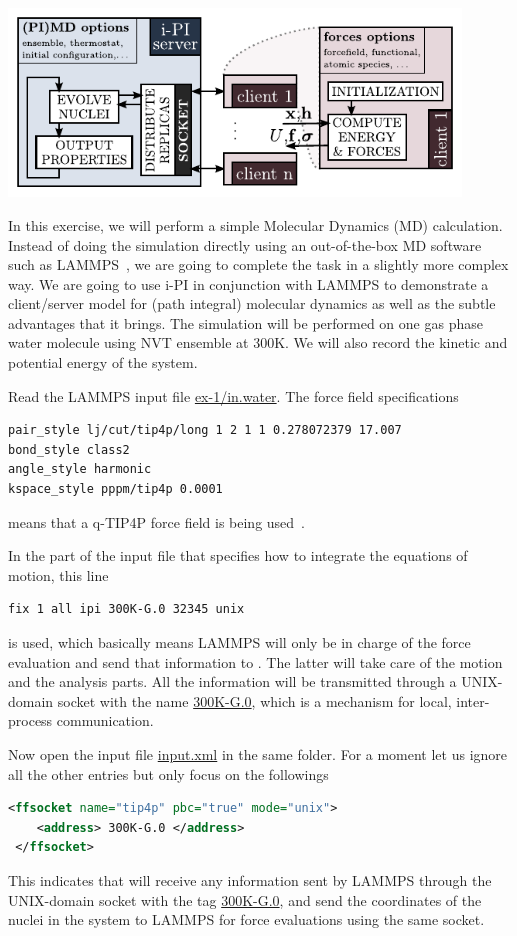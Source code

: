 \documentclass{article}
\begin{document}
\begin{Exercise}[label={i-pi},title={Molecular Dynamics: a client/server approach}]
{\centering\includegraphics[width=0.9\textwidth]{ipi-scheme.pdf}}

In this exercise, we will perform a simple Molecular Dynamics (MD) calculation.
Instead of doing the simulation directly using an out-of-the-box MD software such as LAMMPS~\cite{plim95jcp},
we are going to complete the task in a slightly more complex way.
We are going to use i-PI in conjunction with LAMMPS to demonstrate a client/server model 
for (path integral) molecular dynamics as well as the subtle advantages that it brings.
The simulation will be performed on one gas phase water molecule using NVT ensemble at 300K.
We will also record the kinetic and potential energy of the system.

\Question
Read the LAMMPS input file \url{ex-1/in.water}.
The force field specifications
\begin{lstlisting}[language=bash]
pair_style lj/cut/tip4p/long 1 2 1 1 0.278072379 17.007
bond_style class2 
angle_style harmonic
kspace_style pppm/tip4p 0.0001
\end{lstlisting}
means that a q-TIP4P force field is being used~\cite{habe+09jcp}.

In the part of the input file that specifies how to integrate the
equations of motion, this line
\begin{lstlisting}[language=bash]
fix 1 all ipi 300K-G.0 32345 unix
\end{lstlisting}
is used, which basically means LAMMPS will only be in charge of the 
force evaluation and send that information to \ipi{}.
The latter will take care of the motion and the analysis parts.
All the information will be transmitted through a UNIX-domain socket with the name \url{300K-G.0},
which is a mechanism for local, inter-process communication.

\Question
Now open the \ipi{} input file \url{input.xml} in the same folder.
For a moment let us ignore all the other entries but only focus on the followings
\begin{lstlisting}[language=xml]
 <ffsocket name="tip4p" pbc="true" mode="unix">
    <address> 300K-G.0 </address>
 </ffsocket>
\end{lstlisting}
This indicates that \ipi{} will receive any information sent by LAMMPS through the UNIX-domain socket with the tag \url{300K-G.0},
and send the coordinates of the nuclei in the system to LAMMPS for force evaluations using the same socket.


\end{Exercise}
\end{document}
